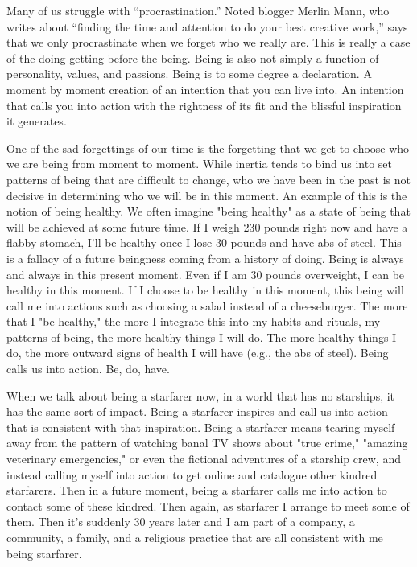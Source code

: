 \documentclass[ebook,12pt,openany,twoside]{memoir}
\begin{document}
Many of us struggle with ``procrastination.'' Noted blogger Merlin Mann, who
writes about ``finding the time and attention to do your best creative work,''
says that we only procrastinate when we forget who we really are. This is
really a case of the doing getting before the being. Being is also not simply a
function of personality, values, and passions. Being is to some degree a
declaration. A moment by moment creation of an intention that you can live
into. An intention that calls you into action with the rightness of its fit and
the blissful inspiration it generates.

One of the sad forgettings of our time is the forgetting that we get to choose
who we are being from moment to moment. While inertia tends to bind us into set
patterns of being that are difficult to change, who we have been in the past is
not decisive in determining who we will be in this moment. An example of this
is the notion of being healthy. We often imagine "being healthy" as a state of
being that will be achieved at some future time. If I weigh 230 pounds right
now and have a flabby stomach, I'll be healthy once I lose 30 pounds and have
abs of steel. This is a fallacy of a future beingness coming from a history of
doing. Being is always and always in this present moment. Even if I am 30
pounds overweight, I can be healthy in this moment. If I choose to be healthy
in this moment, this being will call me into actions such as choosing a salad
instead of a cheeseburger. The more that I "be healthy," the more I integrate
this into my habits and rituals, my patterns of being, the more healthy things
I will do. The more healthy things I do, the more outward signs of health I
will have (e.g., the abs of steel). Being calls us into action. Be, do, have.

When we talk about being a starfarer now, in a world that has no starships, it
has the same sort of impact. Being a starfarer inspires and call us into action
that is consistent with that inspiration. Being a starfarer means tearing
myself away from the pattern of watching banal TV shows about "true crime,"
"amazing veterinary emergencies," or even the fictional adventures of a
starship crew, and instead calling myself into action to get online and
catalogue other kindred starfarers. Then in a future moment, being a starfarer
calls me into action to contact some of these kindred. Then again, as starfarer
I arrange to meet some of them. Then it's suddenly 30 years later and I am part
of a company, a community, a family, and a religious practice that are all
consistent with me being starfarer.
\end{document}
